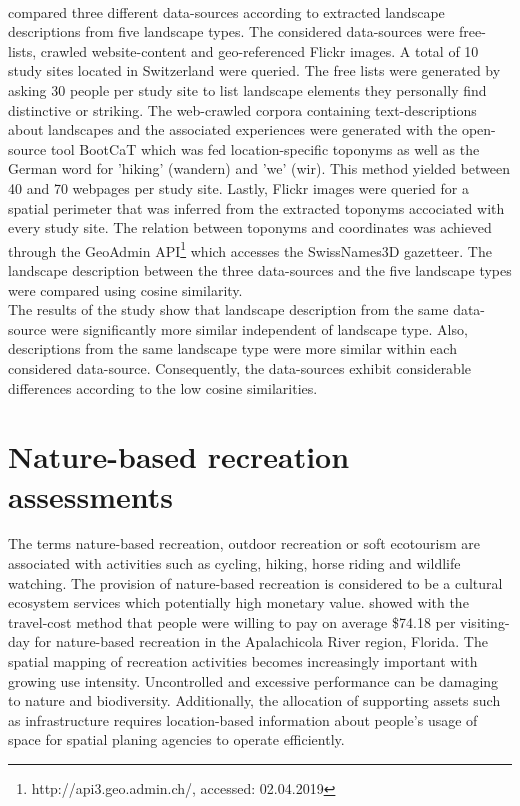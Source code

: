 \paragraph*{\textcite{Wartmann2018}} compared three different data-sources according to extracted landscape descriptions from five landscape types. The considered data-sources were free-lists, crawled website-content and geo-referenced Flickr images. A total of 10 study sites located in Switzerland were queried. The free lists were generated by asking 30 people per study site to list landscape elements they personally find distinctive or striking. The web-crawled corpora containing text-descriptions about landscapes and the associated experiences were generated with the open-source tool BootCaT \parencite{Baroni2004} which was fed location-specific toponyms as well as the German word for 'hiking' (wandern) and 'we' (wir). This method yielded between 40 and 70 webpages per study site. Lastly, Flickr images were queried for a spatial perimeter that was inferred from the extracted toponyms accociated with every study site. The relation between toponyms and coordinates was achieved through the GeoAdmin API\footnote{http://api3.geo.admin.ch/, accessed: 02.04.2019} which accesses the SwissNames3D gazetteer. The landscape description between the three data-sources and the five landscape types were compared using cosine similarity. \\ 
The results of the study show that landscape description from the same data-source were significantly more similar independent of landscape type. Also, descriptions from the same landscape type were more similar within each considered data-source. Consequently, the data-sources exhibit considerable differences according to the low cosine similarities.


\section{Nature-based recreation assessments}
The terms nature-based recreation, outdoor recreation or soft ecotourism \parencite{Deng2002} are associated with activities such as cycling, hiking, horse riding and wildlife watching. The provision of nature-based recreation is considered to be a cultural ecosystem services which potentially high monetary value. \textcite{Shrestha2007} showed with the travel-cost method that people were willing to pay on average \$74.18 per visiting-day for nature-based recreation in the Apalachicola River region, Florida. 
The spatial mapping of recreation activities becomes increasingly important with growing use intensity. Uncontrolled and excessive performance can be damaging to nature and biodiversity.
Additionally, the allocation of supporting assets such as infrastructure requires location-based information about people's usage of space for spatial planing agencies to operate efficiently.

